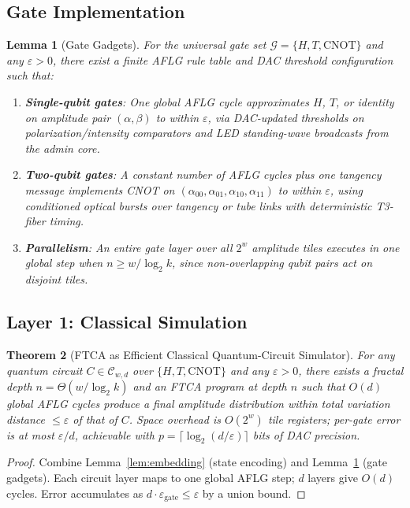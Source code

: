 \documentclass[11pt,letterpaper]{article}
\newtheorem{theorem}{Theorem}
\newtheorem{lemma}[theorem]{Lemma}
\begin{document}
\subsection{Gate Implementation}

\begin{lemma}[Gate Gadgets]
\label{lem:gates}
For the universal gate set $\mathcal{G} = \{H, T, \mathrm{CNOT}\}$ and any $\varepsilon > 0$, there exist a finite AFLG rule table and DAC threshold configuration such that:
\begin{enumerate}
  \item \textbf{Single-qubit gates}: One global AFLG cycle approximates $H$, $T$, or identity on amplitude pair $(\alpha, \beta)$ to within $\varepsilon$, via DAC-updated thresholds on polarization/intensity comparators and LED standing-wave broadcasts from the admin core.
  \item \textbf{Two-qubit gates}: A constant number of AFLG cycles plus one tangency message implements CNOT on $(\alpha_{00}, \alpha_{01}, \alpha_{10}, \alpha_{11})$ to within $\varepsilon$, using conditioned optical bursts over tangency or tube links with deterministic T3-fiber timing.
  \item \textbf{Parallelism}: An entire gate layer over all $2^w$ amplitude tiles executes in one global step when $n \ge w / \log_2 k$, since non-overlapping qubit pairs act on disjoint tiles.
\end{enumerate}
\end{lemma}

\subsection{Layer 1: Classical Simulation}

\begin{theorem}[FTCA as Efficient Classical Quantum-Circuit Simulator]
\label{thm:classical}
For any quantum circuit $C \in \mathcal{C}_{w,d}$ over $\{H, T, \mathrm{CNOT}\}$ and any $\varepsilon > 0$, there exists a fractal depth $n = \Theta(w / \log_2 k)$ and an FTCA program at depth $n$ such that $O(d)$ global AFLG cycles produce a final amplitude distribution within total variation distance $\le \varepsilon$ of that of $C$. Space overhead is $O(2^w)$ tile registers; per-gate error is at most $\varepsilon / d$, achievable with $p = \lceil \log_2(d/\varepsilon) \rceil$ bits of DAC precision.
\end{theorem}

\begin{proof}
Combine Lemma~\ref{lem:embedding} (state encoding) and Lemma~\ref{lem:gates} (gate gadgets). Each circuit layer maps to one global AFLG step; $d$ layers give $O(d)$ cycles. Error accumulates as $d \cdot \varepsilon_{\text{gate}} \le \varepsilon$ by a union bound.
\end{proof}
\end{document}
